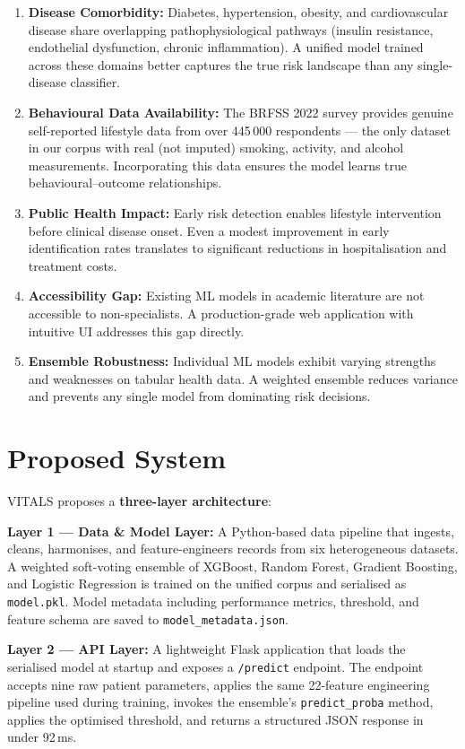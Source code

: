 \documentclass[12pt,a4paper]{report}
\begin{document}
\begin{enumerate}[leftmargin=*]
  \item \textbf{Disease Comorbidity:} Diabetes, hypertension, obesity, and cardiovascular disease share overlapping pathophysiological pathways (insulin resistance, endothelial dysfunction, chronic inflammation). A unified model trained across these domains better captures the true risk landscape than any single-disease classifier.
  \item \textbf{Behavioural Data Availability:} The BRFSS 2022 survey provides genuine self-reported lifestyle data from over 445\,000 respondents — the only dataset in our corpus with real (not imputed) smoking, activity, and alcohol measurements. Incorporating this data ensures the model learns true behavioural--outcome relationships.
  \item \textbf{Public Health Impact:} Early risk detection enables lifestyle intervention before clinical disease onset. Even a modest improvement in early identification rates translates to significant reductions in hospitalisation and treatment costs.
  \item \textbf{Accessibility Gap:} Existing ML models in academic literature are not accessible to non-specialists. A production-grade web application with intuitive UI addresses this gap directly.
  \item \textbf{Ensemble Robustness:} Individual ML models exhibit varying strengths and weaknesses on tabular health data. A weighted ensemble reduces variance and prevents any single model from dominating risk decisions.
\end{enumerate}

\section{Proposed System}

VITALS proposes a \textbf{three-layer architecture}:

\textbf{Layer 1 — Data \& Model Layer:} A Python-based data pipeline that ingests, cleans, harmonises, and feature-engineers records from six heterogeneous datasets. A weighted soft-voting ensemble of XGBoost, Random Forest, Gradient Boosting, and Logistic Regression is trained on the unified corpus and serialised as \texttt{model.pkl}. Model metadata including performance metrics, threshold, and feature schema are saved to \texttt{model\_metadata.json}.

\textbf{Layer 2 — API Layer:} A lightweight Flask application that loads the serialised model at startup and exposes a \texttt{/predict} endpoint. The endpoint accepts nine raw patient parameters, applies the same 22-feature engineering pipeline used during training, invokes the ensemble's \texttt{predict\_proba} method, applies the optimised threshold, and returns a structured JSON response in under 92\,ms.
\end{document}

